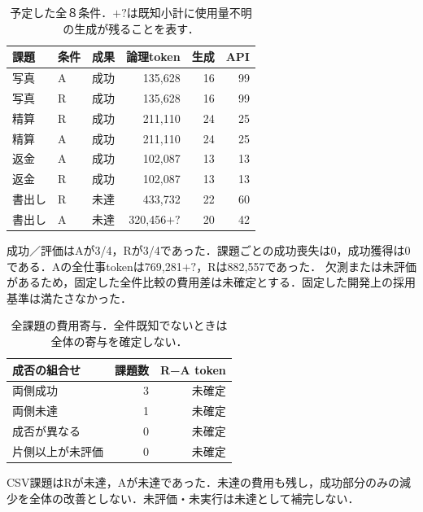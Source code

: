 \begin{table}[tb]
\centering\footnotesize\setlength{\tabcolsep}{3pt}
\caption{予定した全８条件．$+?$は既知小計に使用量不明の生成が残ることを表す．}
\begin{tabular}{lllrrr}
課題 & 条件 & 成果 & 論理token & 生成 & API \\ \hline
写真 & A & 成功 & 135,628 & 16 & 99 \\
写真 & R & 成功 & 135,628 & 16 & 99 \\
精算 & R & 成功 & 211,110 & 24 & 25 \\
精算 & A & 成功 & 211,110 & 24 & 25 \\
返金 & A & 成功 & 102,087 & 13 & 13 \\
返金 & R & 成功 & 102,087 & 13 & 13 \\
書出し & R & 未達 & 433,732 & 22 & 60 \\
書出し & A & 未達 & 320,456$+?$ & 20 & 42 \\
\hline\end{tabular}
\end{table}
成功／評価はAが3/4，Rが3/4であった．課題ごとの成功喪失は0，成功獲得は0である．Aの全仕事tokenは769,281$+?$，Rは882,557であった．
欠測または未評価があるため，固定した全件比較の費用差は未確定とする．固定した開発上の採用基準は満たさなかった．
\begin{table}[tb]
\centering\footnotesize\setlength{\tabcolsep}{3pt}
\caption{全課題の費用寄与．全件既知でないときは全体の寄与を確定しない．}
\begin{tabular}{lrr}
成否の組合せ & 課題数 & R−A token \\ \hline
両側成功 & 3 & 未確定 \\
両側未達 & 1 & 未確定 \\
成否が異なる & 0 & 未確定 \\
片側以上が未評価 & 0 & 未確定 \\
\hline\end{tabular}
\end{table}
CSV課題はRが未達，Aが未達であった．未達の費用も残し，成功部分のみの減少を全体の改善としない．未評価・未実行は未達として補完しない．
